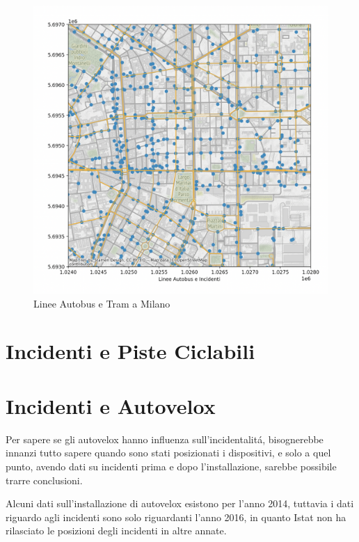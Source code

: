\documentclass[a4paper]{report}
\begin{document}
\begin{figure}[!ht]
    \includegraphics[width=\linewidth]{../src/atm/22_marzo.png}
    \caption{Linee Autobus e Tram a Milano}
    \label{fig:22_marzo}
\end{figure}


\newpage
\section{Incidenti e Piste  Ciclabili}

\newpage
\section{Incidenti e Autovelox}

Per sapere se gli autovelox hanno influenza sull'incidentalit\'a, 
bisognerebbe innanzi tutto sapere quando sono stati posizionati i dispositivi, e solo a quel punto, 
avendo dati su incidenti prima e dopo l'installazione, sarebbe possibile trarre conclusioni.

Alcuni dati sull'installazione di autovelox esistono per l'anno 2014, tuttavia i dati 
riguardo agli incidenti sono solo riguardanti l'anno 2016, in quanto Istat non ha rilasciato 
le posizioni degli incidenti in altre annate.

\end{document}
